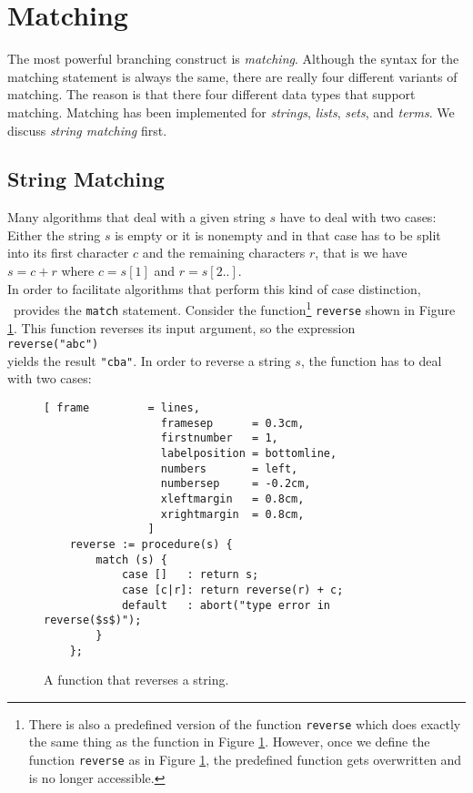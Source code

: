 \section{Matching}
The most powerful branching construct is \emph{matching}.  Although the syntax for the
matching statement is always the same, there are really four different variants of matching.  The
reason is that there four different data types that support matching.  Matching has been implemented for 
 \emph{strings}, \emph{lists}, \emph{sets}, and \emph{terms}.  We discuss \emph{string matching} first.

\subsection{String Matching}
Many algorithms that deal with a given string $s$ have to deal with two cases:  Either the string $s$ is
empty or it is nonempty and in that case has to be split into its first character $c$ and the
remaining characters $r$, that is we have 
\\[0.2cm]
\hspace*{1.3cm}
$s = c + r$ \quad where $c = s[1]$ and $r = s[2..]$.
\\[0.2cm]
In order to facilitate algorithms that perform this kind of case distinction, \setlx\ provides the
\texttt{match} statement.  Consider the function\footnote{
There is also a predefined version of the function \texttt{reverse} which does exactly the
same thing as the function in Figure \ref{fig:reverse.stlx}.  However, once we define the
function \texttt{reverse} as in Figure \ref{fig:reverse.stlx}, the predefined function
gets overwritten and is no longer accessible.}
 \texttt{reverse} shown in Figure \ref{fig:reverse.stlx}.
This function reverses its input argument, so the expression
\\[0.2cm]
\hspace*{1.3cm}
\texttt{reverse("abc")}
\\[0.2cm]
yields the result \texttt{"cba"}.  In order to reverse a string $s$, the function has to deal with two
cases:
\begin{figure}[!ht]
\centering
\begin{Verbatim}[ frame         = lines, 
                  framesep      = 0.3cm, 
                  firstnumber   = 1,
                  labelposition = bottomline,
                  numbers       = left,
                  numbersep     = -0.2cm,
                  xleftmargin   = 0.8cm,
                  xrightmargin  = 0.8cm,
                ]
    reverse := procedure(s) {
        match (s) {
            case []   : return s;
            case [c|r]: return reverse(r) + c;
            default   : abort("type error in reverse($s$)");
        }
    };
\end{Verbatim}
\vspace*{-0.3cm}
\caption{A function that reverses a string.}
\label{fig:reverse.stlx}
\end{figure}
